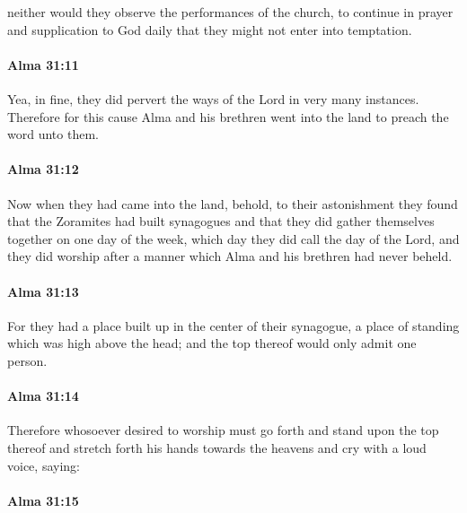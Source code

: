 			neither would they observe the performances of the church,
			to continue in prayer and supplication to God daily
			that they might not enter into temptation.

		\paragraph{Alma 31:11} %
			\label{ALMA-31-11}

			Yea, in fine, they did pervert the ways of the Lord in very many instances.
			Therefore for this cause Alma and his brethren went into the land
			to preach the word unto them.

		\paragraph{Alma 31:12} %
			\label{ALMA-31-12}

			Now when they had came into the land,
			behold, to their astonishment they found that the Zoramites had built synagogues
			and that they did gather themselves together on one day of the week,
			which day they did call the day of the Lord,
			and they did worship after a manner
			which Alma and his brethren had never beheld.

		\paragraph{Alma 31:13} %
			\label{ALMA-31-13}

			For they had a place built up in the center of their synagogue,
			a place of standing which was high above the head;
			and the top thereof would only admit one person.

		\paragraph{Alma 31:14} %
			\label{ALMA-31-14}

			Therefore whosoever desired to worship
			must go forth and stand upon the top thereof
			and stretch forth his hands towards the heavens
			and cry with a loud voice, saying:

		\paragraph{Alma 31:15} %
			\label{ALMA-31-15}

